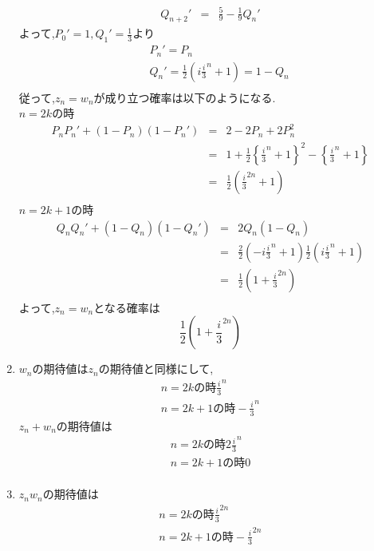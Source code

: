 \documentclass[dvipdfmx,titlepage, 11pt, a4paper]{jsarticle}%
\begin{document}
\begin{enumerate}[(1)]
\begin{eqnarray*}
		Q_{n + 2}' &=& \frac{5}{9} - \frac{1}{9}Q_{n}'
	\end{eqnarray*}
	よって,$P_0' = 1, Q_1' = \frac{1}{3}$より
	\begin{eqnarray*}
		&&P_n' = P_n\\
		&&Q_n' = \frac{1}{2}(i\frac{i}{3}^{n} + 1) = 1 - Q_n\\
	\end{eqnarray*}
	従って,$z_n = w_n$が成り立つ確率は以下のようになる.\\
	$n = 2k$の時
	\begin{eqnarray*}
		P_n P_n' + (1 - P_n)(1 - P_n') &=& 2 - 2P_n + 2P_n^2\\
		&=& 1 + \frac{1}{2}\left\{\frac{i}{3}^{n} + 1\right\}^{2} - \left\{\frac{i}{3}^{n} + 1\right\}\\
		&=& \frac{1}{2}\left(\frac{i}{3}^{2n} + 1\right)\\
	\end{eqnarray*}
	$n = 2k + 1$の時
	\begin{eqnarray*}
	Q_n Q_n' + (1 - Q_n)(1 - Q_n') &=& 2Q_n(1 - Q_n)\\
	 &=& \frac{2}{2}\left(-i\frac{i}{3}^{n} + 1\right)\frac{1}{2}\left(i\frac{i}{3}^{n} + 1\right)\\
	 &=& \frac{1}{2}\left(1 + \frac{i}{3}^{2n}\right) \\
	\end{eqnarray*}
	よって,$z_n = w_n$となる確率は
	\begin{equation*}
		\frac{1}{2}\left(1 + \frac{i}{3}^{2n}\right)
	\end{equation*}
	\item $w_n$の期待値は$z_n$の期待値と同様にして,
	\begin{eqnarray*}
		n = 2kの時\frac{i}{3}^{n}\\
		n = 2k + 1の時-\frac{i}{3}^{n}
	\end{eqnarray*}
	$z_n + w_n$の期待値は
	\begin{eqnarray*}
		n = 2kの時2\frac{i}{3}^{n}\\
		n = 2k + 1の時0\\
	\end{eqnarray*}
	\item $z_nw_n$の期待値は
	\begin{eqnarray*}
		n = 2kの時\frac{i}{3}^{2n}\\
		n = 2k + 1の時-\frac{i}{3}^{2n}
	\end{eqnarray*}
\end{enumerate}
\end{document}
